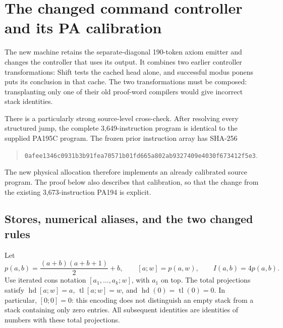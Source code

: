 \section{The changed command controller and its PA calibration}
\label{sec:pa194c-calibration}

The new machine retains the separate-diagonal 190-token axiom emitter and
changes the controller that uses its output.  It combines two earlier
controller transformations: Shift tests the cached head alone, and
successful modus ponens puts its conclusion in that cache.  The two
transformations must be composed: transplanting only one of their old
proof-word compilers would give incorrect stack identities.

There is a particularly strong source-level cross-check.  After resolving
every structured jump, the complete 3,649-instruction program is identical
to the supplied PA195C program.  The frozen prior instruction array has
SHA-256
\begin{quote}\small
\nolinkurl{0afee1346c0931b3b91fea70571b01fd665a802ab9327409e4030f673412f5e3}.
\end{quote}
The new physical allocation therefore implements an already calibrated
source program.  The proof below also describes that calibration, so that
the change from the existing 3,673-instruction PA194 is explicit.

\subsection{Stores, numerical aliases, and the two changed rules}

Let
\[
 p(a,b)=\frac{(a+b)(a+b+1)}2+b,
 \qquad [a;w]=p(a,w),\qquad I(a,b)=4p(a,b).
\]
Use iterated cons notation $[a_1,\ldots,a_k;w]$, with $a_1$ on top.
The total projections satisfy
$\operatorname{hd}[a;w]=a$, $\operatorname{tl}[a;w]=w$, and
$\operatorname{hd}(0)=\operatorname{tl}(0)=0$.  In particular,
$[0;0]=0$: this encoding does not distinguish an empty stack from a
stack containing only zero entries.  All subsequent identities are
identities of numbers with these total projections.

